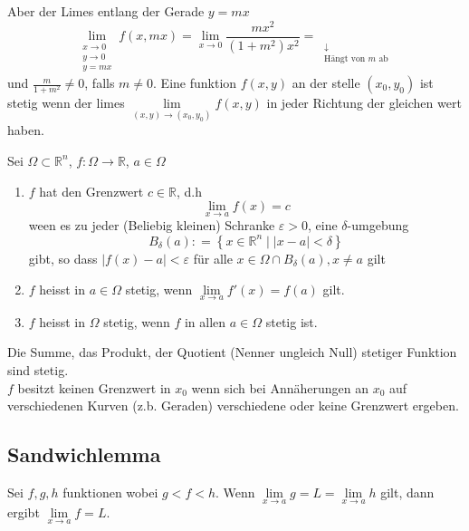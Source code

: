 Aber der Limes entlang der Gerade $y=mx$ 
\[\mathop {\lim }\limits_{\begin{array}{*{20}{c}}
{x \to 0}\\
{y \to 0}\\
{y = mx}
\end{array}} f(x,mx) = \mathop {\lim }\limits_{x \to 0} \frac{{m{x^2}}}{{(1 + {m^2}){x^2}}} = \mathop {\frac{m}{{1 + {m^2}}}}\limits_{\begin{array}{*{20}{c}}
 \downarrow \\
{{\text{Hängt von }} m {\text{ ab}}}
\end{array}} \]
und $\frac{m}{1+m^2}\not=0$, falls $m\not=0$. Eine funktion $f(x,y)$ an der stelle $(x_0,y_0)$ ist stetig wenn der limes $\mathop {\lim }\limits_{(x,y) \to ({x_0},{y_0})} f(x,y)$ in jeder Richtung der gleichen wert haben. 
\begin{definition}{8.1}
Sei $\Omega\subset\mathbb{R}^n$, $f:\Omega \rightarrow\mathbb{R}$, $a\in\Omega$
\begin{enumerate}
\item $f$ hat den Grenzwert $c\in\mathbb{R}$, d.h $$\lim\limits_{x\rightarrow a} f(x)=c$$ ween es zu jeder (Beliebig kleinen) Schranke $\varepsilon>0$, eine $\delta$-umgebung \[{B_\delta }(a): = \left\{ {x \in \mathbb{R}^n}\mid\left| {x - a} \right| < \delta  \right\}\] gibt, so dass $\left| {f(x) - a} \right| < \varepsilon$ für alle $x\in\Omega\cap B_\delta (a), x\not=a$ gilt
\item $f$ heisst in $a\in\Omega$ stetig, wenn $\mathop {\lim }\limits_{x \to a} f'(x) = f(a)$ gilt.
\item $f$ heisst in $\Omega$ stetig, wenn $f$ in allen $a\in\Omega$ stetig ist. 
\end{enumerate}
Die Summe, das Produkt, der Quotient (Nenner ungleich Null) stetiger Funktion sind stetig.\\

$f$ besitzt keinen Grenzwert in $x_0$ wenn sich bei Annäherungen an $x_0$ auf verschiedenen Kurven (z.b. Geraden) verschiedene oder keine Grenzwert ergeben.
\end{definition}

\subsection*{Sandwichlemma}
Sei $f,g,h$ funktionen wobei $g<f<h$. Wenn $\mathop {\lim }\limits_{x \to a} g = L = \mathop {\lim }\limits_{x \to a} h$ gilt, dann ergibt $\lim\limits_{x\rightarrow a}f=L$.\\


